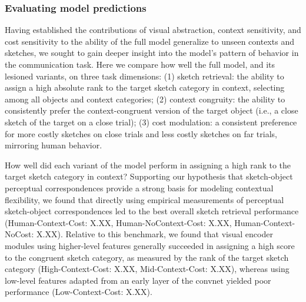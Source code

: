 \documentclass[9pt,twocolumn,twoside]{pnas-new}
\newcommand{\mwu}[1]{{\color{green}{[mwu: #1]}}}
\begin{document}
\subsubsection*{Evaluating model predictions}

Having established the contributions of visual abstraction, context sensitivity, and cost sensitivity to the ability of the full model generalize to unseen contexts and sketches, we sought to gain deeper insight into the model's pattern of behavior in the communication task. Here we compare how well the full model, and its lesioned variants, on three task dimensions: (1) sketch retrieval: the ability to assign a high absolute rank to the target sketch category in context, selecting among all objects and context categories; (2) context congruity: the ability to consistently prefer the context-congruent version of the target object (i.e., a close sketch of the target on a close trial); (3) cost modulation: a consistent preference for more costly sketches on close trials and less costly sketches on far trials, mirroring human behavior.


How well did each variant of the model perform in assigning a high rank to the target sketch category in context? Supporting our hypothesis that sketch-object perceptual correspondences provide a strong basis for modeling contextual flexibility, we found that directly using empirical measurements of perceptual sketch-object correspondences led to the best overall sketch retrieval performance (Human-Context-Cost: X.XX, Human-NoContext-Cost: X.XX, Human-Context-NoCost: X.XX). Relative to this benchmark, we found that visual encoder modules using higher-level features generally succeeded in assigning a high score to the congruent sketch category, as measured by the rank of the target sketch category (High-Context-Cost: X.XX, Mid-Context-Cost: X.XX), whereas using low-level features adapted from an early layer of the convnet yielded poor performance (Low-Context-Cost: X.XX).

\end{document}
